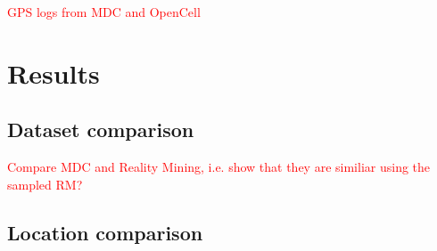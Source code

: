 \documentclass[a4paper,12pt]{article}
\newcommand{\xxx}[1]{\textcolor{red}{#1}}
\begin{document}
\xxx{GPS logs from MDC and OpenCell}

\section{Results}

\subsection{Dataset comparison}

\xxx{Compare MDC and Reality Mining, i.e. show that they are similiar using the sampled RM?}

\subsection{Location comparison}



\end{document}
